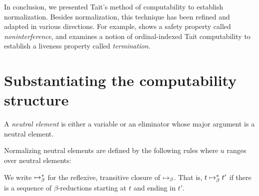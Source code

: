 \documentclass[a4paper]{article}
\begin{document}
In conclusion, we presented Tait's method of computability to establish normalization.
Besides normalization, this technique has been refined and adapted in various directions.
For example, \cite{Derakhshan21} shows a safety property called \emph{noninterference}, and \cite{Spies21} examines a notion of ordinal-indexed Tait computability to establish a liveness property called \emph{termination}.


\appendix
\section{Substantiating the computability structure}
\label{sec:0008}

\begin{definition}
  A \emph{neutral element} is either a variable or an eliminator whose major argument is a neutral element.
\end{definition}

\begin{construction}
  Normalizing neutral elements are defined by the following rules where $u$ ranges over neutral elements:
\end{construction}

\begin{notation}
  We write $\bRed*$ for the reflexive, transitive closure of $\bRed$.
  That is, $t \bRed* t'$ if there is a sequence of $\beta$-reductions starting at $t$ and ending in $t'$.
\end{notation}
\end{document}
